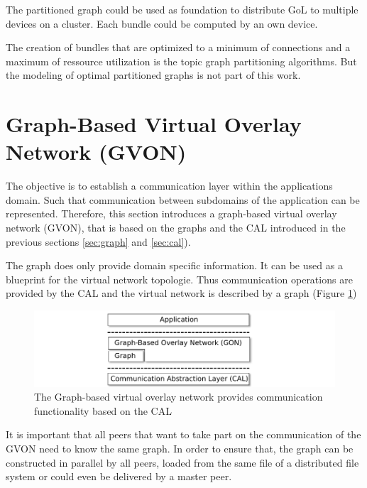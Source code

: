 The partitioned graph could be used as foundation to distribute GoL to
multiple devices on a cluster. Each bundle could be computed by an own
device. 

The creation of bundles that are optimized to a minimum of connections
and a maximum of ressource utilization is the topic graph partitioning
algorithms. But the modeling of optimal partitioned graphs is not part
of this work.


\section{Graph-Based Virtual Overlay Network (GVON)}
The objective is to establish a communication layer within the
applications domain. Such that communication between subdomains of the
application can be represented. Therefore, this section introduces a
graph-based virtual overlay network (GVON), that is based on the graphs and the
CAL introduced in the previous sections \ref{sec:graph} and
\ref{sec:cal}). 

The graph does only provide domain specific information.  It can be
used as a blueprint for the virtual network topologie.  Thus
communication operations are provided by the CAL and the virtual
network is described by a graph (Figure \ref{fig:gvon})

\begin{figure}[H]
  \centering \includegraphics[width=\textwidth]{graphics/30_gon}
  \caption{The Graph-based virtual overlay network provides communication
    functionality based on the CAL}
  \label{fig:gvon}
\end{figure}

It is important that all peers that want to take part on the
communication of the GVON need to know the same graph. In order to
ensure that, the graph can be constructed in parallel by all peers,
loaded from the same file of a distributed file system or could even
be delivered by a master peer.

